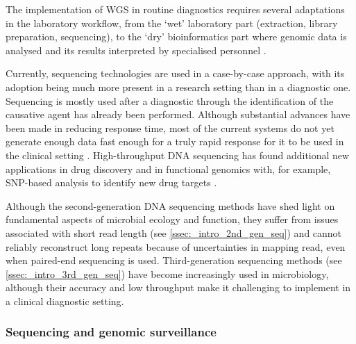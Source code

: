 The implementation of \ac{WGS} in routine diagnostics requires several adaptations in the laboratory workflow, from the ‘wet’ laboratory part (extraction, library preparation, sequencing), to the ‘dry’ bioinformatics part where genomic data is analysed and its results interpreted by specialised personnel \citep{rossen_practical_2018}. 

Currently, sequencing technologies are used in a case-by-case approach, with its adoption being much more present in a research setting than in a diagnostic one. 
Sequencing is mostly used after a diagnostic through the identification of the causative agent has already been performed. 
Although substantial advances have been made in reducing response time, most of the current systems do not yet generate enough data fast enough for a truly rapid response for it to be used in the clinical setting \citep{goodwin_coming_2016}. 
High-throughput DNA sequencing has found additional new applications in drug discovery and in functional genomics with, for example, SNP-based analysis to identify new drug targets \citep{loman_twenty_2015}.

Although the second-generation DNA sequencing methods have shed light on fundamental aspects of microbial ecology and function, they suffer from issues associated with short read length (see \ref{ssec:_intro_2nd_gen_seq}) and cannot reliably reconstruct long repeats because of uncertainties in mapping read, even when paired-end sequencing is used. 
Third-generation sequencing methods (see \ref{ssec:_intro_3rd_gen_seq}) have become increasingly used in microbiology, although their accuracy and low throughput make it challenging to implement in a clinical diagnostic setting. 

\subsubsection{Sequencing and genomic surveillance} \label{sssec:_intro_sequencing_genomic_survaillance}

